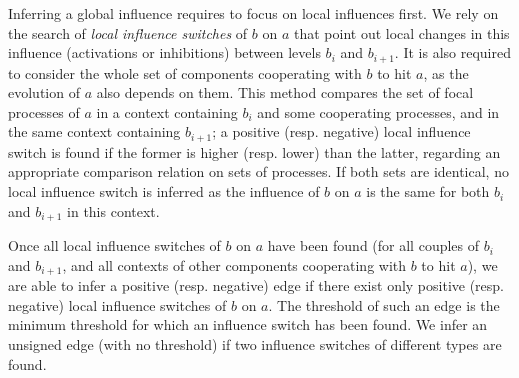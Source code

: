 Inferring a global influence requires to focus on local influences first.
We rely on the search of \emph{local influence switches} of $b$ on $a$ that point out local changes in this influence (activations or inhibitions) between levels $b_i$ and $b_{i+1}$.
It is also required to consider the whole set of components cooperating with $b$ to hit $a$, as the evolution of $a$ also depends on them.
This method compares the set of focal processes of $a$ in a context containing $b_i$ and some cooperating processes, and in the same context containing $b_{i+1}$;
a positive (resp. negative) local influence switch is found if the former is higher (resp. lower) than the latter, regarding an appropriate comparison relation on sets of processes.
If both sets are identical, no local influence switch is inferred as the influence of $b$ on $a$ is the same for both $b_i$ and $b_{i+1}$ in this context.

Once all local influence switches of $b$ on $a$ have been found (for all couples of $b_i$ and $b_{i+1}$, and all contexts of other components cooperating with $b$ to hit $a$),
we are able to infer a positive (resp. negative) edge if there exist only positive (resp. negative) local influence switches of $b$ on $a$.
The threshold of such an edge is the minimum threshold for which an influence switch has been found.
We infer an unsigned edge (with no threshold) if two influence switches of different types are found.

\begin{comment}
The inference of the \emph{influence switches}, which point out local changes in the influence (activations or inhibitions) between levels $b_i$ and $b_{i+1}$, requires to consider the whole set of components cooperating with $b$ to hit $a$.
The method relies on the comparison of the focal processes of $a$ in a context containing $b_i$, and in the same context containing $b_{i+1}$.
We are able to infer a positive (resp. negative) edge if there exist corresponding influence switches with the same sign only; the threshold of such an edge is the minimum threshold for which an influence switch has been found.
We infer an unsigned edge (with non threshold) when two influence switches with different signs are found.
\end{comment}

